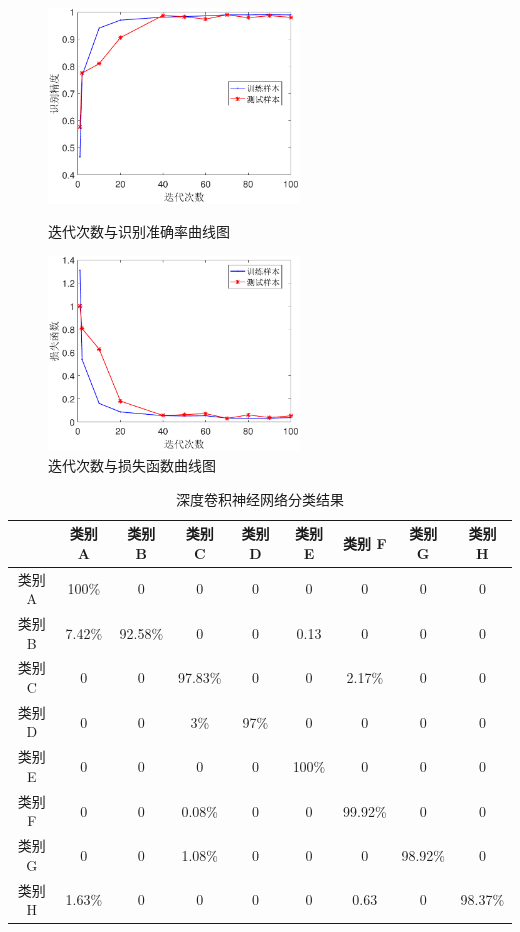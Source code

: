 \begin{figure}[H]
	\centering
	\begin{minipage}{7cm}
		\centering
		\includegraphics[width=6.67cm]{figures/emitter/diff_epoch}
		\caption{迭代次数与识别准确率曲线图}
		\label{fig:openset_epoch}
	\end{minipage}
	\hspace{10pt}
	\begin{minipage}{7cm}
		\centering
		\includegraphics[width=6.67cm]{figures/emitter/diff_loss}
		\caption{迭代次数与损失函数曲线图}
		\label{fig:diff_loss}
	\end{minipage}

\end{figure}

\begin{table}[H]
	\renewcommand{\arraystretch}{1.3}
	\caption{深度卷积神经网络分类结果}
	\centering
	\begin{tabular}{ccccccccc}
		\hline
		 & 类别 A & 类别 B & 类别 C & 类别 D & 类别 E & 类别 F & 类别 G & 类别 H \\
		 \hline
		  类别 A & 100\% & 0 & 0 & 0 & 0 & 0 & 0 & 0 \\
		 类别 B & 7.42\% & 92.58\% & 0 & 0 & 0.13 & 0 & 0 & 0 \\
		 类别 C & 0 & 0 & 97.83\% & 0 & 0 & 2.17\% & 0 & 0 \\
		 类别 D & 0 & 0 & 3\% & 97\% & 0 & 0 & 0 & 0 \\
		 类别 E & 0 & 0 & 0 & 0 & 100\% & 0 & 0 & 0 \\
		 类别 F & 0 & 0 & 0.08\% & 0 & 0 & 99.92\% & 0 & 0 \\
		 类别 G & 0 & 0 & 1.08\% & 0 & 0 & 0 & 98.92\% & 0 \\
		 类别 H & 1.63\% & 0 & 0 & 0 & 0 & 0.63 & 0 & 98.37\% \\
		\hline
	\end{tabular}
\end{table}

